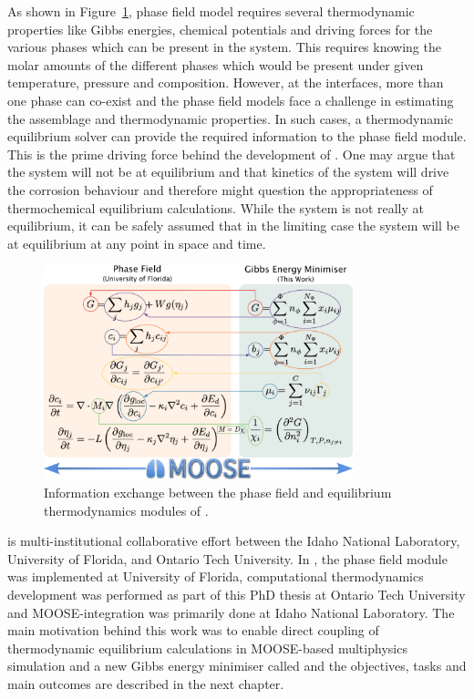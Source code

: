 	As shown in Figure~\ref{fig:yj_io}, {\YJ} phase field model requires several thermodynamic properties like Gibbs energies, chemical potentials and driving forces for the various phases which can be present in the system. This requires knowing the molar amounts of the different phases which would be present under given temperature, pressure and composition. However, at the interfaces, more than one phase can co-exist and the phase field models face a challenge in estimating the assemblage and thermodynamic properties. In such cases, a thermodynamic equilibrium solver can provide the required information to the phase field module. This is the prime driving force behind the development of {\GEM}. One may argue that the system will not be at equilibrium and that kinetics of the system will drive the corrosion behaviour and therefore might question the appropriateness of thermochemical equilibrium calculations. While the system is not really at equilibrium, it can be safely assumed that in the limiting case the system will be at equilibrium at any point in space and time.
	\begin{figure}[htb]
		\centering
		\includegraphics[width=0.8\textwidth]{figures/chapter-1/YJ_PF_IO.pdf}
		\caption{Information exchange between the phase field and equilibrium thermodynamics modules of \YJ.}
		\label{fig:yj_io}
	\end{figure} 	

	{\YJ} is multi-institutional collaborative effort between the Idaho National Laboratory, University of Florida, and Ontario Tech University.  In {\YJ}, the phase field module was implemented at University of Florida, computational thermodynamics development was performed as part of this PhD thesis at Ontario Tech University and MOOSE-integration was primarily done at Idaho National Laboratory. The main motivation behind this work was to enable direct coupling of thermodynamic equilibrium calculations in MOOSE-based multiphysics simulation and a new Gibbs energy minimiser called {\GEM} and the objectives, tasks and main outcomes are described in the next chapter.
	
